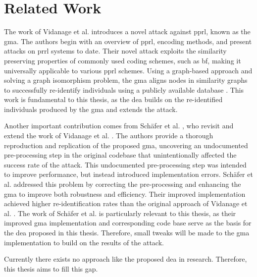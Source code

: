 \section{Related Work}  \label{sec:rel-work}

The work of Vidanage et al. \cite{vidanage2020graph} introduces a novel attack against \ac{pprl}, known as the \ac{gma}.
The authors begin with an overview of \ac{pprl}, encoding methods, and present attacks on \ac{prrl} systems to date.
Their novel attack exploits the similarity preserving properties of commonly used coding schemes, such as \ac{bf}, making it universally applicable to various \ac{pprl} schemes.
Using a graph-based approach and solving a graph isomorphism problem, the \ac{gma} aligns nodes in similarity graphs to successfully re-identify individuals using a publicly available database \cite{vidanage2020graph}.
This work is fundamental to this thesis, as the \ac{dea} builds on the re-identified individuals produced by the \ac{gma} and extends the attack.

Another important contribution comes from Schäfer et al. \cite{schaefer2024}, who revisit and extend the work of Vidanage et al. \cite{vidanage2020graph}.
The authors provide a thorough reproduction and replication of the proposed \ac{gma}, uncovering an undocumented pre-processing step in the original codebase that unintentionally affected the success rate of the attack.
This undocumented pre-processing step was intended to improve performance, but instead introduced implementation errors.
Schäfer et al. addressed this problem by correcting the pre-processing and enhancing the \ac{gma} to improve both robustness and efficiency.
Their improved implementation achieved higher re-identification rates than the original approach of Vidanage et al. \cite{schaefer2024}.
The work of Schäfer et al. is particularly relevant to this thesis, as their improved \ac{gma} implementation and corresponding code base serve as the basis for the \ac{dea} proposed in this thesis.
Therefore, small tweaks will be made to the \ac{gma} implementation to build on the results of the attack.

Currently there exists no approach like the proposed \ac{dea} in research. Therefore, this thesis aims to fill this gap.


